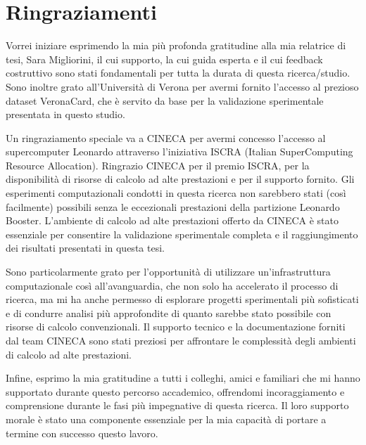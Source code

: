 \section{Ringraziamenti}

Vorrei iniziare esprimendo la mia più profonda gratitudine alla mia relatrice di tesi, Sara Migliorini, il cui supporto, la cui guida esperta e il cui feedback costruttivo sono stati fondamentali per tutta la durata di questa ricerca/studio. Sono inoltre grato all'Università di Verona per avermi fornito l'accesso al prezioso dataset VeronaCard, che è servito da base per la validazione sperimentale presentata in questo studio.

Un ringraziamento speciale va a CINECA per avermi concesso l'accesso al supercomputer Leonardo attraverso l'iniziativa ISCRA (Italian SuperComputing Resource Allocation). Ringrazio CINECA per il premio ISCRA, per la disponibilità di risorse di calcolo ad alte prestazioni e per il supporto fornito. Gli esperimenti computazionali condotti in questa ricerca non sarebbero stati (così facilmente) possibili senza le eccezionali prestazioni della partizione Leonardo Booster. L'ambiente di calcolo ad alte prestazioni offerto da CINECA è stato essenziale per consentire la validazione sperimentale completa e il raggiungimento dei risultati presentati in questa tesi.

Sono particolarmente grato per l'opportunità di utilizzare un'infrastruttura computazionale così all'avanguardia, che non solo ha accelerato il processo di ricerca, ma mi ha anche permesso di esplorare progetti sperimentali più sofisticati e di condurre analisi più approfondite di quanto sarebbe stato possibile con risorse di calcolo convenzionali. Il supporto tecnico e la documentazione forniti dal team CINECA sono stati preziosi per affrontare le complessità degli ambienti di calcolo ad alte prestazioni.

Infine, esprimo la mia gratitudine a tutti i colleghi, amici e familiari che mi hanno supportato durante questo percorso accademico, offrendomi incoraggiamento e comprensione durante le fasi più impegnative di questa ricerca. Il loro supporto morale è stato una componente essenziale per la mia capacità di portare a termine con successo questo lavoro.
